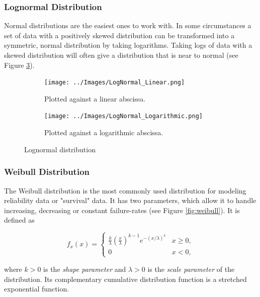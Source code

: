 \subsubsection{Lognormal Distribution}

Normal distributions are the easiest ones to work with. In some circumstances a set of data with a positively skewed distribution can be transformed into a symmetric, normal distribution by taking logarithms. Taking logs of data with a skewed distribution will often give a distribution that is near to normal (see Figure \ref{fig:lognormal}).

\begin{figure}
\centering
\begin{subfigure}{.5\textwidth}
  \centering
  \texttt{[image: ../Images/LogNormal\_Linear.png]}
  \caption{Plotted against a linear abscissa.}
  \label{fig:Lognormal_Sub1}
\end{subfigure}%
\begin{subfigure}{.5\textwidth}
  \centering
  \texttt{[image: ../Images/LogNormal\_Logarithmic.png]}
  \caption{Plotted against a logarithmic abscissa.}
  \label{fig:Lognormal_Sub2}
\end{subfigure}
\caption{Lognormal distribution}
\label{fig:lognormal}
\end{figure}

\subsubsection{Weibull Distribution}

The Weibull distribution is the most commonly used distribution for modeling reliability data or "survival" data. It has two parameters, which allow it to handle increasing, decreasing or constant failure-rates (see Figure \ref{fig:weibull}).
It is defined as

\begin{equation}\label{eq_weibull}
f_x (x) =
  \begin{cases}
    \frac{k}{\lambda}\left(\frac{x}{\lambda}\right)^{k-1}e^{-(x/\lambda)^{k}} & x\geq0 ,\\
    0 & x<0 ,
    \end{cases}
\end{equation}

where $k > 0$ is the \emph{shape parameter }and $\lambda > 0$ is the \emph{scale parameter }of the distribution. Its complementary cumulative distribution function is a stretched exponential function.

